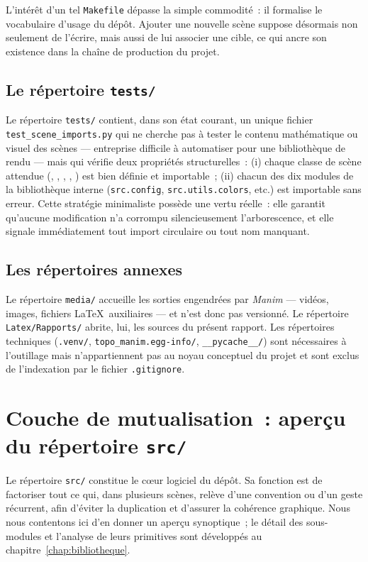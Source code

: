 \documentclass[12pt, a4paper, openany]{report}
\begin{document}
	L’intérêt d’un tel \texttt{Makefile} dépasse la simple commodité~: il formalise le vocabulaire d’usage du dépôt. Ajouter une nouvelle scène suppose désormais non seulement de l’écrire, mais aussi de lui associer une cible, ce qui ancre son existence dans la chaîne de production du projet.

	\subsection{Le répertoire \texttt{tests/}}

	Le répertoire \texttt{tests/} contient, dans son état courant, un unique fichier \texttt{test\_scene\_imports.py} qui ne cherche pas à tester le contenu mathématique ou visuel des scènes — entreprise difficile à automatiser pour une bibliothèque de rendu — mais qui vérifie deux propriétés structurelles~: (i) chaque classe de scène attendue (, , , , ) est bien définie et importable~; (ii) chacun des dix modules de la bibliothèque interne (\texttt{src.config}, \texttt{src.utils.colors}, etc.) est importable sans erreur. Cette stratégie minimaliste possède une vertu réelle~: elle garantit qu’aucune modification n’a corrompu silencieusement l’arborescence, et elle signale immédiatement tout import circulaire ou tout nom manquant.

	\subsection{Les répertoires annexes}

	Le répertoire \texttt{media/} accueille les sorties engendrées par \textit{Manim} — vidéos, images, fichiers \LaTeX\ auxiliaires — et n’est donc pas versionné. Le répertoire \texttt{Latex/Rapports/} abrite, lui, les sources du présent rapport. Les répertoires techniques (\texttt{.venv/}, \texttt{topo\_manim.egg-info/}, \texttt{\_\_pycache\_\_/}) sont nécessaires à l’outillage mais n’appartiennent pas au noyau conceptuel du projet et sont exclus de l’indexation par le fichier \texttt{.gitignore}.
	
	\section{Couche de mutualisation~: aperçu du répertoire \texttt{src/}}

	Le répertoire \texttt{src/} constitue le cœur logiciel du dépôt. Sa fonction est de factoriser tout ce qui, dans plusieurs scènes, relève d’une convention ou d’un geste récurrent, afin d’éviter la duplication et d’assurer la cohérence graphique. Nous nous contentons ici d’en donner un aperçu synoptique~; le détail des sous-modules et l’analyse de leurs primitives sont développés au chapitre~\ref{chap:bibliotheque}.
\end{document}
